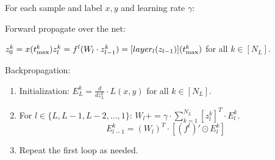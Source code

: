 \begin{mdframed}[backgroundcolor=green_background, linecolor=black, linewidth=2pt, frametitle=\textbf{Pseudo-code}] \label{pscode:BP-time}

For each sample and label \(x,y\) and learning rate \(\gamma\):

Forward propagate over the net:

\(z_0^k = x(t_{\text{max}}^k) \\ z_l^k = f^l (W_l \cdot z_{l-1}^k) = [layer_l (z_{l-1})](t_{\text{max}}^k)\) for all \(k \in [N_L]\).

Backpropagation:

\begin{enumerate}
    \item Initialization:
    \(E_L^k = \frac{d}{dz_L^k} \cdot L(x,y)\) for all \(k \in [N_L]\).

    \item For \(l \in \{L, L-1, L-2, \ldots, 1\}\):
    \(W_l += \gamma \cdot \sum_{k=1}^{N_L} [z_l^k]^T \cdot E_l^k\).
    \[E_{l-1}^k = (W_l)^T \cdot [(f^l)' \odot E_l^k] \]

    \item Repeat the first loop as needed.
    
\end{enumerate}

\end{mdframed}

